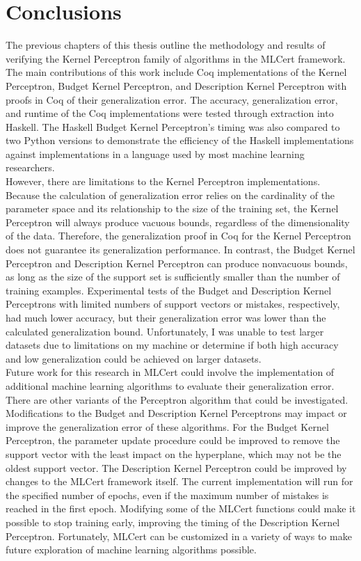 \chapter{Conclusions}\label{ConclusionsChapter}

The previous chapters of this thesis outline the methodology and results of verifying the Kernel Perceptron family of algorithms in the MLCert framework. The main contributions of this work include Coq implementations of the Kernel Perceptron, Budget Kernel Perceptron, and Description Kernel Perceptron with proofs in Coq of their generalization error. The accuracy, generalization error, and runtime of the Coq implementations were tested through extraction into Haskell. The Haskell Budget Kernel Perceptron's timing was also compared to two Python versions to demonstrate the efficiency of the Haskell implementations against implementations in a language used by most machine learning researchers.
\\However, there are limitations to the Kernel Perceptron implementations. Because the calculation of generalization error relies on the cardinality of the parameter space and its relationship to the size of the training set, the Kernel Perceptron will always produce vacuous bounds, regardless of the dimensionality of the data. Therefore, the generalization proof in Coq for the Kernel Perceptron does not guarantee its generalization performance. In contrast, the Budget Kernel Perceptron and Description Kernel Perceptron can produce nonvacuous bounds, as long as the size of the support set is sufficiently smaller than the number of training examples. Experimental tests of the Budget and Description Kernel Perceptrons with limited numbers of support vectors or mistakes, respectively, had much lower accuracy, but their generalization error was lower than the calculated generalization bound. Unfortunately, I was unable to test larger datasets due to limitations on my machine or determine if both high accuracy and low generalization could be achieved on larger datasets.
\\Future work for this research in MLCert could involve the implementation of additional machine learning algorithms to evaluate their generalization error. There are other variants of the Perceptron algorithm that could be investigated. Modifications to the Budget and Description Kernel Perceptrons may impact or improve the generalization error of these algorithms. For the Budget Kernel Perceptron, the parameter update procedure could be improved to remove the support vector with the least impact on the hyperplane, which may not be the oldest support vector. The Description Kernel Perceptron could be improved by changes to the MLCert framework itself. The current implementation will run for the specified number of epochs, even if the maximum number of mistakes is reached in the first epoch. Modifying some of the MLCert functions could make it possible to stop training early, improving the timing of the Description Kernel Perceptron. Fortunately, MLCert can be customized in a variety of ways to make future exploration of machine learning algorithms possible.

